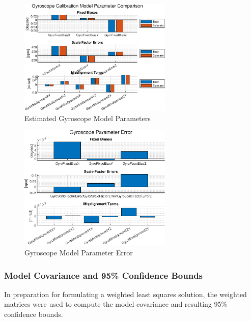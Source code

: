 \begin{figure}[h] 
	\centering
	\includegraphics[width=0.65\textwidth]{./images/MAM_gyro_model_parameters.eps}
	\caption{Estimated Gyroscope Model Parameters}
	\label{fig: multi-axis gyroscope parameters}
\end{figure}
\FloatBarrier

\begin{figure}[h] 
	\centering
	\includegraphics[width=0.65\textwidth]{./images/MAM_gyro_model_error.eps}
	\caption{Gyroscope Model Parameter Error}
	\label{fig: multi-axis gyroscope parameter error}
\end{figure}
\FloatBarrier


\subsubsection{Model Covariance and 95\% Confidence Bounds}

In preparation for formulating a weighted least squares solution, the weighted matrices were used to compute the model covariance and resulting 95\% confidence bounds. 

